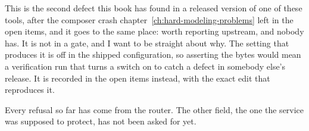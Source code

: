 This is the second defect this book has found in a released version of one of
these tools, after the composer crash chapter~\ref{ch:hard-modeling-problems}
left in the open items, and it goes to the same place: worth reporting
upstream, and nobody has. It is not in a gate, and I want to be straight about
why. The setting that produces it is off in the shipped configuration, so
asserting the bytes would mean a verification run that turns a switch on to
catch a defect in somebody else's release. It is recorded in the open items
instead, with the exact edit that reproduces it.

\medskip

Every refusal so far has come from the router. The other field, the one the
service was supposed to protect, has not been asked for yet.

%

